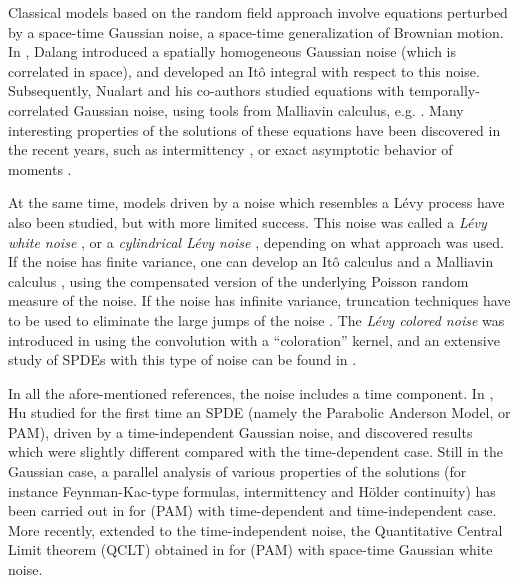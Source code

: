\documentclass[12pt]{article}
\begin{document}
Classical models based on the random field approach involve equations perturbed by a space-time Gaussian noise, a space-time generalization of Brownian motion. In \cite{dalang99}, Dalang introduced a spatially homogeneous Gaussian noise (which is correlated in space), and developed an It\^o integral with respect to this noise. Subsequently, Nualart and his co-authors studied equations with temporally-correlated Gaussian noise, using tools from Malliavin calculus, e.g. \cite{nualart06}. Many interesting properties of the solutions of these equations have been discovered in the recent years, such as intermittency \cite{K14}, or exact asymptotic behavior of moments \cite{chen17}. 

At the same time, models driven by a noise which resembles a L\'evy process have also been studied, but with more limited success. %
This noise was called a {\em L\'evy white noise} \cite{B15}, or a {\em cylindrical L\'evy noise} \cite{kumar-riedle20}, depending on what approach was used. If the noise has finite variance, one can develop an It\^o calculus \cite{applebaum09} and a Malliavin calculus \cite{last16}, using the compensated version of the underlying Poisson random measure of the noise. If the noise has infinite variance, truncation techniques have to be used to eliminate the large jumps of the noise \cite{chong17-SPA,CDH19}. The {\em L\'evy colored noise}
was introduced in \cite{B15} using the convolution with a ``coloration'' kernel, and an extensive study of SPDEs with this type of noise can be found in \cite{BJ26}.
 

In all the afore-mentioned references, the noise includes a time component. In \cite{hu01}, Hu studied for the first time an SPDE (namely the Parabolic Anderson Model, or PAM), driven by a time-independent Gaussian noise, and discovered results which were slightly different compared with the time-dependent case. Still in the Gaussian case, a parallel analysis of various properties of the solutions (for instance Feynman-Kac-type formulas, intermittency and H\"older continuity) has been carried out in \cite{HHNT15} for (PAM) with  time-dependent and time-independent case. More recently, \cite{BY23} extended to the time-independent  noise, the Quantitative Central Limit theorem (QCLT) obtained in \cite{HNV20} for (PAM) with space-time Gaussian white noise.
\end{document}
